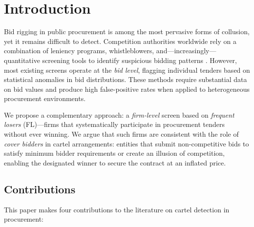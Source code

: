 \documentclass[10pt]{article}
\begin{document}
\section{Introduction}
\label{sec:intro}

Bid rigging in public procurement is among the most pervasive forms of collusion, yet it remains difficult to detect. Competition authorities worldwide rely on a combination of leniency programs, whistleblowers, and---increasingly---quantitative screening tools to identify suspicious bidding patterns \citep{harrington2008detecting, imhof2019detecting}. However, most existing screens operate at the \textit{bid level}, flagging individual tenders based on statistical anomalies in bid distributions. These methods require substantial data on bid values and produce high false-positive rates when applied to heterogeneous procurement environments.

We propose a complementary approach: a \textit{firm-level} screen based on \textit{frequent losers} (FL)---firms that systematically participate in procurement tenders without ever winning. We argue that such firms are consistent with the role of \textit{cover bidders} in cartel arrangements: entities that submit non-competitive bids to satisfy minimum bidder requirements or create an illusion of competition, enabling the designated winner to secure the contract at an inflated price.

\subsection{Contributions}

This paper makes four contributions to the literature on cartel detection in procurement:
\end{document}
